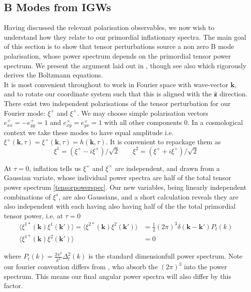 \documentclass[a4paper,10pt]{article}
\renewcommand{\v}[1]{\mathbf{#1}}
\newcommand{\half}{\frac{1}{2}}
\newcommand{\unit}[1]{\hat{\v{#1}}}
\begin{document}
\subsection{B Modes from IGWs}

Having discussed the relevant polarisation observables, we now wish to understand how they relate to our primordial inflationary spectra. The main goal of this section is to show that tensor perturbations source a non zero B mode polarisation, whose power spectrum depends on the primordial tensor power spectrum. We present the argument laid out in \cite{all-sky}, though see also \cite{kowosky} which rigorously derives the Boltzmann equations.\\

It is most convenient throughout to work in Fourier space with wave-vector $\v{k}$, and to rotate our coordinate system such that this is aligned with the $\unit{z}$ direction. There exist two independent polarisations of the tensor perturbation for our Fourier mode: $\xi^+$ and $\xi^\times$. We may choose simple polarisation vectors $e^+_{xx}=-e^+_{yy}=1$ and $e^\times_{xy}=e^\times_{yx}=1$ with all other components 0. In a cosmological context we take these modes to have equal amplitude i.e. $\xi^+(\v{k},\tau)=\xi^\times(\v{k},\tau)=h(\v{k},\tau)$. It is convenient to repackage them as
\begin{equation}
\xi^1 = (\xi^+ - i\xi^\times)/\sqrt{2} \qquad \xi^2 = (\xi^+ + i\xi^\times)/\sqrt{2}
\end{equation}

At $\tau=0$, inflation tells us $\xi^+$ and $\xi^\times$ are independent, and drawn from a Gaussian variate, whose individual power spectra are half of the total tensor power spectrum \ref{tensorpowerspec}. Our new variables, being linearly independent combinations of $\xi^s$, are also Gaussians, and a short calculation reveals they are also independent with each having also having half of the the total primordial tensor power, i.e. at $\tau=0$ 
\begin{equation}
\begin{split}
\langle \xi^{1*}(\v{k})\xi^{1}(\v{k'})\rangle=\langle \xi^{2*}(\v{k})\xi^{2}(\v{k'})\rangle &=\half (2\pi)^3\delta(\v{k}-\v{k'})P_t(k)\\
\langle \xi^{1*}(\v{k})\xi^{2}(\v{k'})\rangle &=0
\end{split}
\label{statprops}
\end{equation}

where $P_t(k) = \frac{2\pi^2}{k^3}\Delta_t^2(k)$ is the standard dimensionfull power spectrum. Note our fourier convention differs from \cite{all-sky}, who absorb the $(2\pi)^3$ into the power spectrum. This means our final angular power spectra will also differ by this factor.\\
\end{document}
